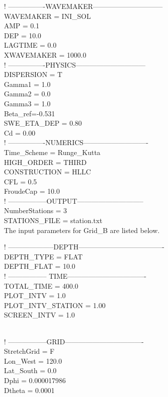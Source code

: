 \documentclass[11pt]{article}
\begin{document}
  ! ----------------WAVEMAKER------------------------------\\
 WAVEMAKER = INI\_SOL\\
  AMP = 0.1\\
DEP = 10.0\\
LAGTIME = 0.0\\
XWAVEMAKER = 1000.0\\


! ----------------PHYSICS------------------------------\\
DISPERSION = T\\
Gamma1 = 1.0\\
Gamma2 = 0.0\\
Gamma3 = 1.0\\
Beta\_ref=-0.531\\
SWE\_ETA\_DEP = 0.80\\
Cd = 0.00\\

  ! ----------------NUMERICS----------------------------\\
  Time\_Scheme = Runge\_Kutta\\
HIGH\_ORDER = THIRD\\
CONSTRUCTION = HLLC\\
CFL = 0.5\\
FroudeCap = 10.0\\

  ! -----------------OUTPUT-----------------------------\\
  NumberStations = 3\\
  STATIONS\_FILE = station.txt\\
  

The input parameters for Grid\_B are listed below.

\vspace*{0.5cm}
  ! --------------------DEPTH------------------------------------- \\
DEPTH\_TYPE = FLAT\\
DEPTH\_FLAT = 10.0\\

  ! ----------------- TIME----------------------------------\\
TOTAL\_TIME = 400.0\\
PLOT\_INTV = 1.0\\
PLOT\_INTV\_STATION = 1.00\\
SCREEN\_INTV = 1.0\\\

  ! -----------------GRID----------------------------------\\
  StretchGrid = F\\
Lon\_West = 120.0\\
Lat\_South = 0.0\\
Dphi = 0.000017986\\
Dtheta = 0.0001 \\
\end{document}
